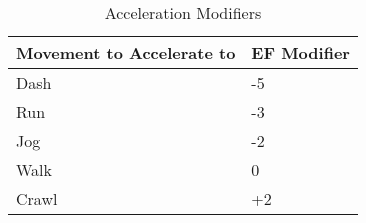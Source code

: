 \begin{table}[h]
\caption{Acceleration Modifiers}
\centering
	\begin{tabular}{||l|l||} \hline
	Movement to Accelerate to	&	EF Modifier \\ \hline
	Dash						&	-5 			\\
	Run							&	-3			\\
	Jog							&	-2			\\
	Walk						&	0			\\
	Crawl						&	+2			\\ \hline
	\end{tabular}
\end{table}
